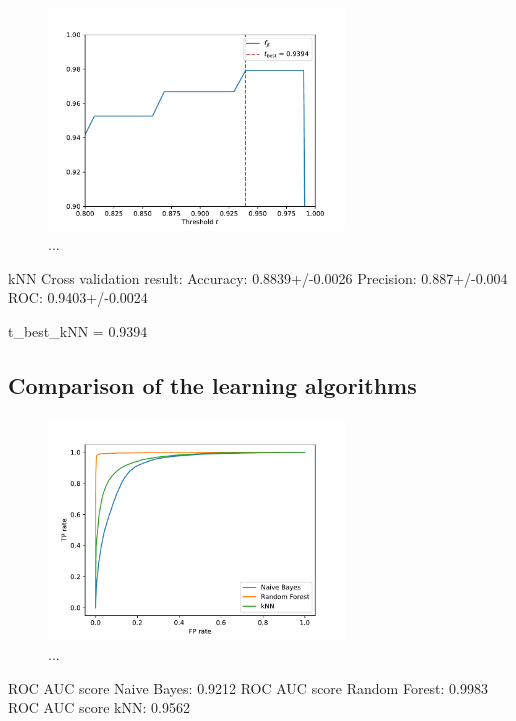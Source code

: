 \begin{figure}
    \centering
    \includegraphics[width=0.7\textwidth]{content/plots/f_beta_kNN.pdf}
    \caption{...}
    \label{fig:f_beta_kNN}
\end{figure}

kNN Cross validation result:
Accuracy: 0.8839+/-0.0026
Precision: 0.887+/-0.004
ROC: 0.9403+/-0.0024

t_best_kNN = 0.9394

\subsection{Comparison of the learning algorithms}

\begin{figure}
    \centering
    \includegraphics[width=0.7\textwidth]{content/plots/ROC_all.pdf}
    \caption{...}
    \label{fig:f_ROC_all}
\end{figure}

ROC AUC score Naive Bayes: 	 0.9212
ROC AUC score Random Forest: 	 0.9983
ROC AUC score kNN: 		 0.9562

